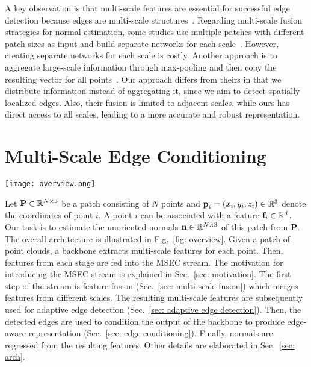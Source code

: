 \documentclass[sigconf]{acmart}
\begin{document}
A key observation is that multi-scale features are essential for successful edge detection because edges are multi-scale structures~\cite{marr1980theory}. Regarding multi-scale fusion strategies for normal estimation, some studies use multiple patches with different patch sizes as input and build separate networks for each scale~\cite{guerrero2018pcpnet,ben2019nesti}. However, creating separate networks for each scale is costly. Another approach is to aggregate large-scale information through max-pooling and then copy the resulting vector for all points~\cite{zhu2021adafit,li2022graphfit,li2022hsurf}. Our approach differs from theirs in that we distribute information instead of aggregating it, since we aim to detect spatially localized edges. Also, their fusion is limited to adjacent scales, while ours has direct access to all scales, leading to a more accurate and robust representation.








\section{Multi-Scale Edge Conditioning}\label{sec: method}

\begin{figure*}[tbhp]
    \centering
    \texttt{[image: overview.png]}
    \caption{The architecture of MSECNet. The MSEC stream consists of multi-scale fusion, edge detection, and edge conditioning steps. LBR stands for a sequential application of a Linear transformation, a batch normalization, and a ReLU. }
    \label{fig: overview}
    \Description{}
\end{figure*}

Let $\textbf{P} \in \mathbb{R}^{N\times3}$ be a patch consisting of $N$ points and $\textbf{p}_i=(x_i, y_i, z_i)\in\mathbb{R}^{3}$ denote the coordinates of point $i$. A point $i$ can be associated with a feature $\textbf{f}_i \in \mathbb{R}^{d}$. Our task is to estimate the unoriented normals $\textbf{n}\in\mathbb{R}^{N \times 3}$ of this patch from $\textbf{P}$. 
The overall architecture is illustrated in Fig.~\ref{fig: overview}. 
Given a patch of point clouds, a backbone extracts multi-scale features for each point. 
Then, features from each stage are fed into the MSEC stream. The motivation for introducing the MSEC stream is explained in Sec.~\ref{sec: motivation}.
The first step of the stream is feature fusion (Sec.~\ref{sec: multi-scale fusion}) which merges features from different scales. The resulting multi-scale features are subsequently used for adaptive edge detection (Sec.~\ref{sec: adaptive edge detection}). Then, the detected edges are used to condition the output of the backbone to produce edge-aware representation (Sec.~\ref{sec: edge conditioning}).  
Finally, normals are regressed from the resulting features. Other details are elaborated in Sec.~\ref{sec: arch}.
\end{document}
